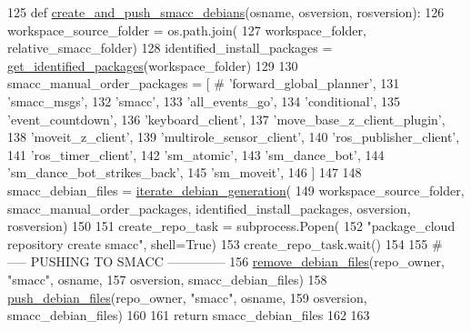 \begin{DoxyCode}
125 \textcolor{keyword}{def }\hyperlink{namespacegenerate__debs_af7237c463c8e5b4df369e6befc154c50}{create\_and\_push\_smacc\_debians}(osname, osversion, rosversion):
126     workspace\_source\_folder = os.path.join(
127         workspace\_folder, relative\_smacc\_folder)
128     identified\_install\_packages = \hyperlink{namespacegenerate__debs_aa91b87c6d9c3ed04015845cc9298431a}{get\_identified\_packages}(workspace\_folder)
129 
130     smacc\_manual\_order\_packages = [  \textcolor{comment}{# 'forward\_global\_planner',}
131         \textcolor{stringliteral}{'smacc\_msgs'},
132         \textcolor{stringliteral}{'smacc'},
133         \textcolor{stringliteral}{'all\_events\_go'},
134         \textcolor{stringliteral}{'conditional'},
135         \textcolor{stringliteral}{'event\_countdown'},
136         \textcolor{stringliteral}{'keyboard\_client'},
137         \textcolor{stringliteral}{'move\_base\_z\_client\_plugin'},
138         \textcolor{stringliteral}{'moveit\_z\_client'},
139         \textcolor{stringliteral}{'multirole\_sensor\_client'},
140         \textcolor{stringliteral}{'ros\_publisher\_client'},
141         \textcolor{stringliteral}{'ros\_timer\_client'},
142         \textcolor{stringliteral}{'sm\_atomic'},
143         \textcolor{stringliteral}{'sm\_dance\_bot'},
144         \textcolor{stringliteral}{'sm\_dance\_bot\_strikes\_back'},
145         \textcolor{stringliteral}{'sm\_moveit'},
146     ]
147 
148     smacc\_debian\_files = \hyperlink{namespacegenerate__debs_a2615a6fc7860b6aa9e920e6b4d886589}{iterate\_debian\_generation}(
149         workspace\_source\_folder, smacc\_manual\_order\_packages, identified\_install\_packages, osversion, 
      rosversion)
150 
151     create\_repo\_task = subprocess.Popen(
152         \textcolor{stringliteral}{"package\_cloud repository create smacc"}, shell=\textcolor{keyword}{True})
153     create\_repo\_task.wait()
154 
155     \textcolor{comment}{# ----- PUSHING TO SMACC --------------}
156     \hyperlink{namespacegenerate__debs_a08095040d038b3613ad0e77fd4e7f60e}{remove\_debian\_files}(repo\_owner, \textcolor{stringliteral}{"smacc"},  osname,
157                         osversion, smacc\_debian\_files)
158     \hyperlink{namespacegenerate__debs_a9b22f5ad65b40b7903c467eda308e575}{push\_debian\_files}(repo\_owner, \textcolor{stringliteral}{"smacc"},  osname,
159                       osversion, smacc\_debian\_files)
160 
161     \textcolor{keywordflow}{return} smacc\_debian\_files
162 
163 
\end{DoxyCode}


